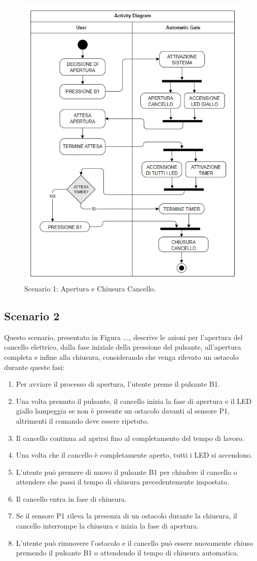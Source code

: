 \documentclass[12pt]{article}
\begin{document}
\begin{figure}[H]
    \centering
    \includegraphics[width = 0.7 \textwidth ]{Scenario_1.jpg}
    \caption{Scenario 1: Apertura e Chiusura Cancello.}
    
\end{figure}

\subsection{Scenario 2}
Questo scenario, presentato in Figura ..., descrive le azioni per l’apertura del cancello elettrico, dalla fase iniziale della pressione del pulsante, all’apertura completa e infine alla chiusura, considerando che venga rilevato un ostacolo durante queste fasi:
\begin{enumerate}
    \item Per avviare il processo di apertura, l’utente preme il pulsante B1.
    \item Una volta premuto il pulsante, il cancello inizia la fase di apertura e il LED giallo lampeggia se non è presente un ostacolo davanti al sensore P1, altrimenti il comando deve essere ripetuto.
    \item Il cancello continua ad aprirsi fino al completamento del tempo di lavoro.
    \item Una volta che il cancello è completamente aperto, tutti i LED si accendono.
    \item L'utente può premere di nuovo il pulsante B1 per chiudere il cancello o attendere che passi il tempo di chiusura precedentemente impostato.
    \item Il cancello entra in fase di chiusura.
    \item Se il sensore P1 rileva la presenza di un ostacolo durante la chiusura, il cancello interrompe la chiusura e inizia la fase di apertura.
    \item L’utente può rimuovere l’ostacolo e il cancello può essere nuovamente chiuso premendo il pulsante B1 o attendendo il tempo di chiusura automatica.
\end{enumerate}
\end{document}
